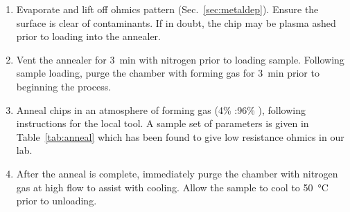 \begin{enumerate}
    \item Evaporate and lift off ohmics pattern (Sec.~\ref{sec:metaldep}). Ensure the surface is clear of contaminants. If in doubt, the chip may be plasma ashed prior to loading into the annealer.
    \item Vent the annealer for \SI{3}{\minute} with nitrogen prior to loading sample. Following sample loading, purge the chamber with forming gas for \SI{3}{\minute} prior to beginning the process.
    \item Anneal chips in an atmosphere of forming gas (4\% :96\% ), following instructions for the local tool. A sample set of parameters is given in Table~\ref{tab:anneal} which has been found to give low resistance ohmics in our lab.
    \item After the anneal is complete, immediately purge the chamber with nitrogen gas at high flow to assist with cooling. Allow the sample to cool to \SI{50}{\celsius} prior to unloading.
\end{enumerate}